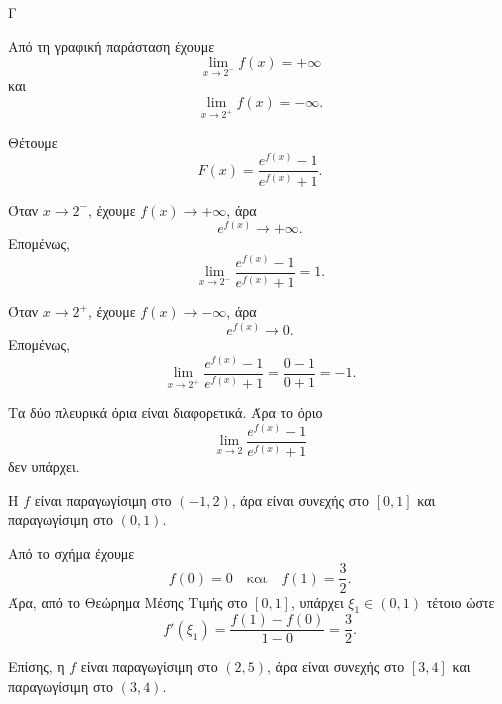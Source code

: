 \begin{thema}{Γ}

\begin{center}
\end{center}

\begin{erwthma}
\item Από τη γραφική παράσταση έχουμε
\[
\lim_{x\to 2^-}f(x)=+\infty
\]
και
\[
\lim_{x\to 2^+}f(x)=-\infty.
\]

Θέτουμε
\[
F(x)=\frac{e^{f(x)}-1}{e^{f(x)}+1}.
\]

Όταν $x\to 2^-$, έχουμε $f(x)\to+\infty$, άρα
\[
e^{f(x)}\to+\infty.
\]
Επομένως,
\[
\lim_{x\to 2^-}\frac{e^{f(x)}-1}{e^{f(x)}+1}=1.
\]

Όταν $x\to 2^+$, έχουμε $f(x)\to-\infty$, άρα
\[
e^{f(x)}\to 0.
\]
Επομένως,
\[
\lim_{x\to 2^+}\frac{e^{f(x)}-1}{e^{f(x)}+1}
=\frac{0-1}{0+1}=-1.
\]

Τα δύο πλευρικά όρια είναι διαφορετικά. Άρα το όριο
\[
\lim_{x\to 2}\frac{e^{f(x)}-1}{e^{f(x)}+1}
\]
δεν υπάρχει.

\item Η $f$ είναι παραγωγίσιμη στο $(-1,2)$, άρα είναι συνεχής στο $[0,1]$ και παραγωγίσιμη στο $(0,1)$.

Από το σχήμα έχουμε
\[
f(0)=0
\quad \text{και}\quad
f(1)=\frac{3}{2}.
\]
Άρα, από το Θεώρημα Μέσης Τιμής στο $[0,1]$, υπάρχει $\xi_1\in(0,1)$ τέτοιο ώστε
\[
f'(\xi_1)=\frac{f(1)-f(0)}{1-0}
=\frac{3}{2}.
\]

Επίσης, η $f$ είναι παραγωγίσιμη στο $(2,5)$, άρα είναι συνεχής στο $[3,4]$ και παραγωγίσιμη στο $(3,4)$.


\end{erwthma}
\end{thema}
